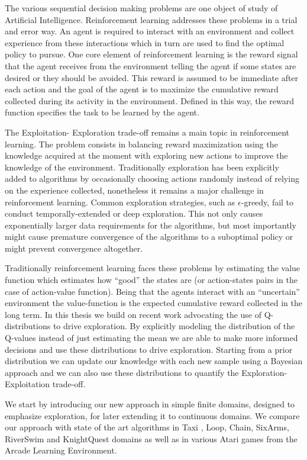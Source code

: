 \par
The various sequential decision making problems are one object of study of Artificial Intelligence. Reinforcement learning addresses these problems in a trial and error way.  An agent is required to interact with an environment and collect experience from these interactions which in turn are used to find the optimal policy to pursue. One core element of reinforcement learning is the reward signal that the agent receives from the environment telling the agent if some states are desired or they should be avoided. This reward is assumed to be immediate after each action and the goal of the agent is to maximize the cumulative reward collected during its activity in the environment. Defined in this way, the reward function specifies the task to be learned by the agent.\par
The Exploitation- Exploration trade-off remains a main topic in reinforcement learning. The problem consists in balancing reward maximization using the knowledge acquired at the moment with exploring new actions to improve the knowledge of the environment. Traditionally exploration has been explicitly added to algorithms by occasionally choosing actions randomly instead of relying on the experience collected, nonetheless it remains a major challenge in reinforcement learning. Common exploration strategies, such as $\epsilon$-greedy, fail to conduct temporally-extended or deep exploration. This not only causes exponentially larger data requirements for the algorithms, but most importantly might cause premature convergence of the algorithms to a suboptimal policy or might prevent convergence altogether.\par
Traditionally reinforcement learning faces these problems by estimating the value function  which estimates how ``good'' the states are (or action-states pairs in the case of action-value function). Being that the agents interact with an ``uncertain'' environment the value-function is the expected cumulative reward collected in the long term. In this thesis we build on recent work advocating the use of Q-distributions to drive exploration. By explicitly modeling the distribution of the Q-values instead of just estimating the mean we are able to make more informed decisions and use these distributions to drive exploration. Starting from a prior distribution we can update our knowledge with each new sample using a Bayesian approach and we can also use these distributions to quantify the Exploration-Exploitation trade-off.\par
We start by introducing our new approach in simple finite domains, designed to emphasize exploration, for later extending it to continuous domains.   We compare our approach with state of the art algorithms in Taxi , Loop, Chain, SixArms, RiverSwim and KnightQuest domains as well as in various Atari games from the Arcade Learning Environment.